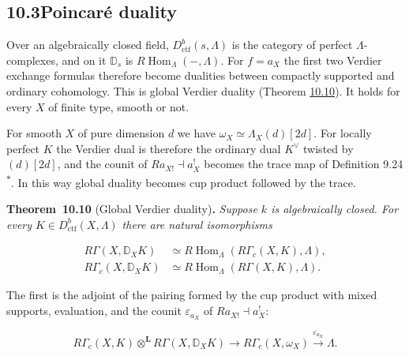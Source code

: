 \documentclass[11pt]{article}
\newenvironment{bpstatement}[2]{\par\addvspace{0.6\baselineskip}\noindent\textbf{#1}#2\textbf{.}\enspace\ignorespaces}
  {\par\addvspace{0.4\baselineskip}}
\newenvironment{bpstatementit}[2]{\begin{bpstatement}{#1}{#2}\itshape\ignorespaces}{\end{bpstatement}}
\newcommand{\bpout}[1]{#1\textsuperscript{\hyperlink{bp-outside}{\ensuremath{\ast}}}}
\begin{document}
\subsection*{\texorpdfstring{10.3\quad Poincaré duality}{10.3 Poincaré duality}}
\label{bp30}%
\label{bp31}%
Over an algebraically closed field, \(D^b_{\mathrm{ctf}}(s,\Lambda)\) is the category of perfect \(\Lambda\)-complexes, and on it \(\mathbb D_s\) is \(R\!\operatorname{Hom}_\Lambda(-,\Lambda)\). For \(f=a_X\) the first two Verdier exchange formulas therefore become dualities between compactly supported and ordinary cohomology. This is global Verdier duality (Theorem \hyperref[bp32]{10.10}). It holds for every \(X\) of finite type, smooth or not.

For smooth \(X\) of pure dimension \(d\) we have \(\omega_X\simeq\Lambda_X(d)[2d]\). For locally perfect \(K\) the Verdier dual is therefore the ordinary dual \(K^\vee\) twisted by \((d)[2d]\), and the counit of \(Ra_{X!}\dashv a_X^!\) becomes the trace map of Definition \bpout{9.24}. In this way global duality becomes cup product followed by the trace.

\label{bp32}%
\begin{bpstatementit}{Theorem~10.10}{ (Global Verdier duality)}
Suppose \(k\) is algebraically closed. For every \(K\in D^b_{\mathrm{ctf}}(X,\Lambda)\) there are natural isomorphisms

\begin{align*}
R\Gamma(X,\mathbb D_XK)&\simeq
R\!\operatorname{Hom}_\Lambda(R\Gamma_c(X,K),\Lambda),
\tag{10.5}\\
R\Gamma_c(X,\mathbb D_XK)&\simeq
R\!\operatorname{Hom}_\Lambda(R\Gamma(X,K),\Lambda).
\tag{10.6}\end{align*}

The first is the adjoint of the pairing formed by the cup product with mixed supports, evaluation, and the counit \(\varepsilon_{a_X}\) of \(Ra_{X!}\dashv a_X^!\):

\[
R\Gamma_c(X,K)\otimes^{\mathbf L}R\Gamma(X,\mathbb D_XK)
\longrightarrow R\Gamma_c(X,\omega_X)
\xrightarrow{\varepsilon_{a_X}}\Lambda.
\]
\end{bpstatementit}
\end{document}
